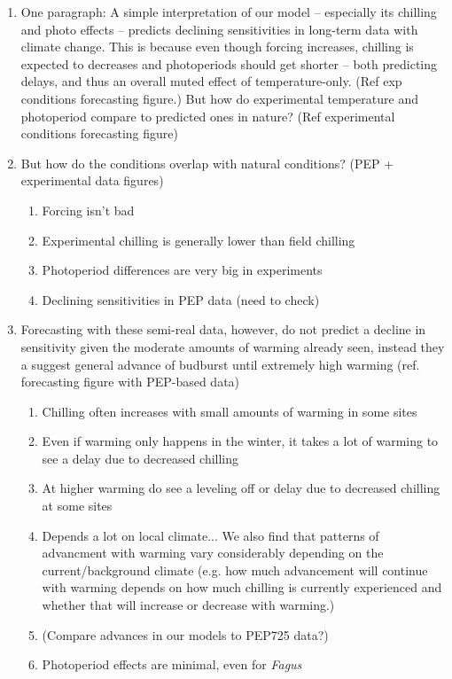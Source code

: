 \documentclass[11pt,letter]{article}
\begin{document}
\begin{enumerate}
\item One paragraph: A simple interpretation of our model -- especially its chilling and photo effects -- predicts declining sensitivities in long-term data with climate change. This is because even though forcing increases, chilling is expected to decreases and photoperiods should get shorter -- both predicting delays, and thus an overall muted effect of temperature-only.  (Ref exp conditions forecasting figure.) But how do experimental temperature and photoperiod compare to predicted ones in nature? (Ref experimental conditions forecasting figure)

\item But how do the conditions overlap with natural conditions? (PEP + experimental data figures)
\begin{enumerate}
\item Forcing isn't bad
\item Experimental chilling is generally lower than field chilling
\item Photoperiod differences are very big in experiments
\item Declining sensitivities in PEP data (need to check)
\end{enumerate}

\item Forecasting with these semi-real data, however, do not predict a decline in sensitivity given the moderate amounts of warming already seen, instead they a suggest general advance of budburst until extremely high warming (ref. forecasting figure with PEP-based data)

\begin{enumerate}
\item Chilling often increases with small amounts of warming in some sites
\item Even if warming only happens in the winter, it takes a lot of warming to see a delay due to decreased chilling
\item At higher warming do see a leveling off or delay due to decreased chilling at some sites
\item Depends a lot on local climate... We also find that patterns of advancment with warming vary considerably depending on the current/background climate (e.g. how much advancement will continue with warming depends on how much chilling is currently experienced and whether that will increase or decrease with warming.)
\item (Compare advances in our models to PEP725 data?)
\item Photoperiod effects are minimal, even for \emph{Fagus}
\end{enumerate}


\end{enumerate}
\end{document}
